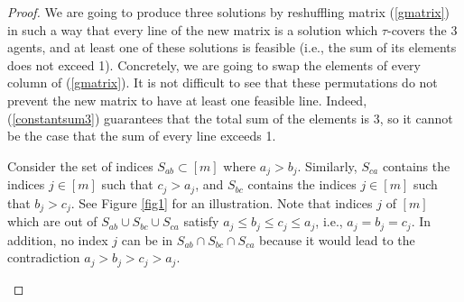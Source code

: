 \documentclass{article}
\begin{document}
\begin{proof}
We are going to produce three solutions by reshuffling matrix (\ref{gmatrix}) in such a way that every line of the new matrix is a solution which  
$\tau$-covers the 3 agents, and at least one of these solutions is feasible (i.e., the sum of its elements does not exceed 1). Concretely, we are going to swap the elements of every column of (\ref{gmatrix}). It is not difficult to see that these permutations do not prevent the new matrix to have at least one feasible line. Indeed, (\ref{constantsum3}) guarantees that the total sum of the elements is 3, so it cannot be the case that the sum of every line exceeds 1.     



Consider the set of indices $S_{ab} \subset [m]$ where $a_j>b_j$. Similarly, $S_{ca}$ contains the indices $j \in [m]$ such that $c_j>a_j$, and $S_{bc}$ contains the indices $j \in [m]$ such that $b_j>c_j$. See Figure \ref{fig1} for an illustration. 
Note that indices $j$ of $[m]$ which are out of $S_{ab}\cup S_{bc}\cup S_{ca}$ satisfy $a_j\le b_j \le c_j \le a_j$, i.e., $a_j=b_j=c_j$. In addition, no index $j$ can be in $S_{ab}\cap S_{bc}\cap S_{ca}$ because it would lead to the contradiction $a_j> b_j> c_j > a_j$.


\begin{figure}
\begin{center}
\end{center}
\end{figure}
\end{proof}
\end{document}
